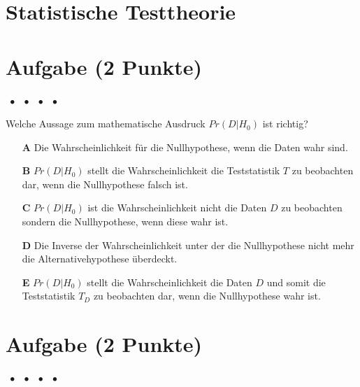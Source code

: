 \documentclass[a4paper, 9pt]{scrartcl}\usepackage[]{graphicx}\usepackage[]{xcolor}
\begin{document}
\section*{Statistische Testtheorie}  

\section{Aufgabe \hfill (2 Punkte)}

\ifcollection
\begin{flushright}
\tiny\vspace{-2Ex}
\textbf{\examinhaltstart}
\exammodulemathstat $\;\bullet$
\exammodulestat $\;\bullet$
\exammodulestatbbv $\;\bullet$
\exammodulestatversuch $\;\bullet$
\exammodulebiostat
\vspace{-1Ex}
\end{flushright}
\fi




Welche Aussage zum mathematische Ausdruck $Pr(D|H_0)$ ist richtig?



\begin{enumerate}
\item [\textbf{A} \msquare] Die Wahrscheinlichkeit für die Nullhypothese, wenn die Daten wahr sind.
\item [\textbf{B} \msquare] $Pr(D|H_0)$ stellt die Wahrscheinlichkeit die Teststatistik $T$ zu beobachten dar, wenn die Nullhypothese falsch ist.
\item [\textbf{C} \msquare] $Pr(D|H_0)$ ist die Wahrscheinlichkeit nicht die Daten $D$ zu beobachten sondern die Nullhypothese, wenn diese wahr ist.
\item [\textbf{D} \msquare] Die Inverse der Wahrscheinlichkeit unter der die Nullhypothese nicht mehr die Alternativehypothese überdeckt.
\item [\textbf{E} \msquare] $Pr(D|H_0)$ stellt die Wahrscheinlichkeit die Daten $D$ und somit die Teststatistik $T_D$ zu beobachten dar, wenn die Nullhypothese wahr ist.
\end{enumerate} 

\section{Aufgabe \hfill (2 Punkte)}

\ifcollection
\begin{flushright}
\tiny\vspace{-2Ex}
\textbf{\examinhaltstart}
\exammodulemathstat $\;\bullet$
\exammodulestat $\;\bullet$
\exammodulestatbbv $\;\bullet$
\exammodulestatversuch $\;\bullet$
\exammodulebiostat
\vspace{-1Ex}
\end{flushright}
\fi
\end{document}
